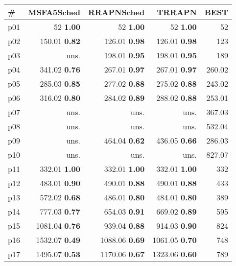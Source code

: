 \begin{tabular}{|l|rrr|r|}
\hline
\textbf{\#} & \textbf{MSFA5Sched} & \textbf{RRAPNSched} & \textbf{TRRAPN} & \textbf{BEST}\\
\hline
p01 & {\footnotesize 52} \textbf{1.00} & {\footnotesize 52} \textbf{1.00} & {\footnotesize 52} \textbf{1.00} & 52\\
p02 & {\footnotesize 150.01} \textbf{0.82} & {\footnotesize 126.01} \textbf{0.98} & {\footnotesize 126.01} \textbf{0.98} & 123\\
p03 & uns. & {\footnotesize 198.01} \textbf{0.95} & {\footnotesize 198.01} \textbf{0.95} & 189\\
p04 & {\footnotesize 341.02} \textbf{0.76} & {\footnotesize 267.01} \textbf{0.97} & {\footnotesize 267.01} \textbf{0.97} & 260.02\\
p05 & {\footnotesize 285.03} \textbf{0.85} & {\footnotesize 277.02} \textbf{0.88} & {\footnotesize 275.02} \textbf{0.88} & 243.02\\
p06 & {\footnotesize 316.02} \textbf{0.80} & {\footnotesize 284.02} \textbf{0.89} & {\footnotesize 288.02} \textbf{0.88} & 253.01\\
p07 & uns. & uns. & uns. & 367.03\\
p08 & uns. & uns. & uns. & 532.04\\
p09 & uns. & {\footnotesize 464.04} \textbf{0.62} & {\footnotesize 436.05} \textbf{0.66} & 286.03\\
p10 & uns. & uns. & uns. & 827.07\\
p11 & {\footnotesize 332.01} \textbf{1.00} & {\footnotesize 332.01} \textbf{1.00} & {\footnotesize 332.01} \textbf{1.00} & 332\\
p12 & {\footnotesize 483.01} \textbf{0.90} & {\footnotesize 490.01} \textbf{0.88} & {\footnotesize 490.01} \textbf{0.88} & 433\\
p13 & {\footnotesize 572.02} \textbf{0.68} & {\footnotesize 486.01} \textbf{0.80} & {\footnotesize 484.01} \textbf{0.80} & 389\\
p14 & {\footnotesize 777.03} \textbf{0.77} & {\footnotesize 654.03} \textbf{0.91} & {\footnotesize 669.02} \textbf{0.89} & 595\\
p15 & {\footnotesize 1081.04} \textbf{0.76} & {\footnotesize 939.04} \textbf{0.88} & {\footnotesize 914.03} \textbf{0.90} & 824\\
p16 & {\footnotesize 1532.07} \textbf{0.49} & {\footnotesize 1088.06} \textbf{0.69} & {\footnotesize 1061.05} \textbf{0.70} & 748\\
p17 & {\footnotesize 1495.07} \textbf{0.53} & {\footnotesize 1170.06} \textbf{0.67} & {\footnotesize 1323.06} \textbf{0.60} & 789\\

\end{tabular}

